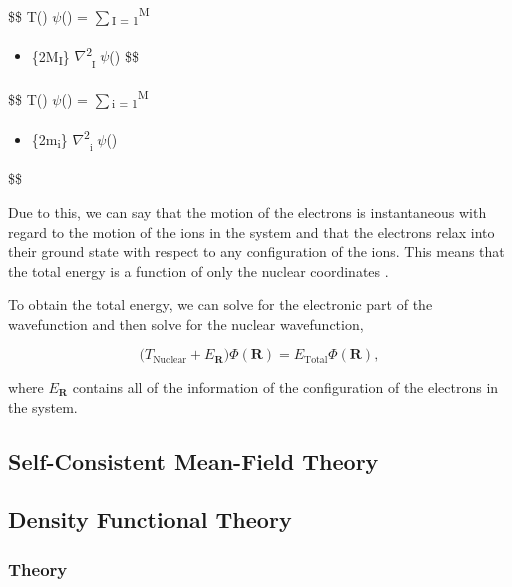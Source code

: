 \documentclass[11pt]{article}
\begin{document}
\$\$ T\textsubscript{}() \(\psi\)\textsubscript{}() = \(\sum\)\textsubscript{I = 1}\textsuperscript{M} 
\begin{itemize}
\item {}\{2M\textsubscript{I}\}
\(\nabla\)\textsuperscript{2}\textsubscript{\textsubscript{I}} \(\psi\)\textsubscript{}()  \$\$
\end{itemize}


\$\$
T\textsubscript{}() \(\psi\)\textsubscript{}() = \(\sum\)\textsubscript{i = 1}\textsuperscript{M} 
\begin{itemize}
\item {}\{2m\textsubscript{i}\}
\(\nabla\)\textsuperscript{2}\textsubscript{\textsubscript{i}} \(\psi\)\textsubscript{}()
\end{itemize}
\$\$

Due to this, we can say that the motion of the electrons is instantaneous with regard to the
motion of the ions in the system and that the electrons relax into their ground state with
respect to any configuration of the ions. This means that the total energy is a function of
only the nuclear coordinates \cite{Finnis1997}. 

To obtain the total energy, we can solve for the electronic part of the wavefunction and then
solve for the nuclear wavefunction,

$$
\Big( T_{\text{Nuclear}} + E_{\mathbf{R}} \Big) \Phi(\mathbf{R}) = E_{\text{Total}} \Phi(\mathbf{R}),
$$

where \(E_{\mathbf{R}}\) contains all of the information of the configuration of the electrons in
the system. 

\subsection{Self-Consistent Mean-Field Theory}
\label{sec:org3296044}


\subsection{Density Functional Theory}
\label{sec:org492279f}

\subsubsection{Theory}
\label{sec:orga91dfbb}
\end{document}
